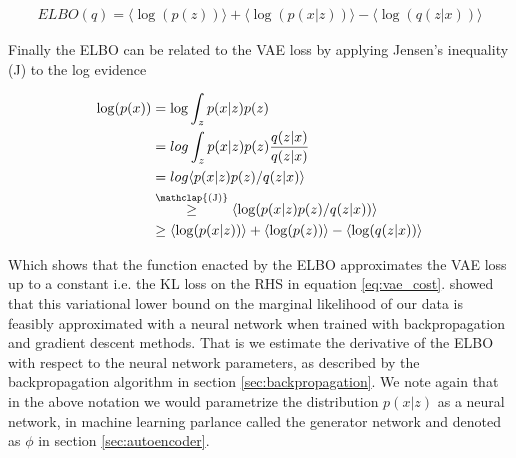 \begin{align}
ELBO(q) = \langle \log(p(z)) \rangle +  \langle \log(p(x|z)) \rangle - \langle \log(q(z|x)) \rangle
\end{align}

\noindent Finally the ELBO can be related to the VAE loss by applying Jensen's inequality (J) to the log evidence 

\begin{align}
\log (p(x)) &= \log \int_z p(x|z) p(z) \\
&= log \int _z p(x|z) p(z) \frac{q(z|x)}{q(z|x)} \\
& = log \langle p(x|z) p(z)/ q(z|x) \rangle \\
&  \stackrel{\mathclap{\text{(J)}}}{\geq} \langle \log (p(x|z) p(z)/ q(z|x))\rangle \\
& \geq \langle \log(p(x|z))\rangle + \langle \log(p(z))\rangle  - \langle \log(q(z|x))\rangle 
\end{align}

\noindent Which shows that the function enacted by the ELBO approximates the VAE loss up to a constant i.e. the KL loss on the RHS in equation \ref{eq:vae_cost}. \citet{Kingma2013} showed that this variational lower bound on the marginal likelihood of our data is feasibly approximated with a neural network when trained with backpropagation and gradient descent methods. That is we estimate the derivative of the ELBO with respect to the neural network parameters, as described by the backpropagation algorithm in section \ref{sec:backpropagation}. We note again that in the above notation we would parametrize the distribution $p(x|z)$ as a neural network, in machine learning parlance called the generator network and denoted as $\phi$ in section \ref{sec:autoencoder}. 
